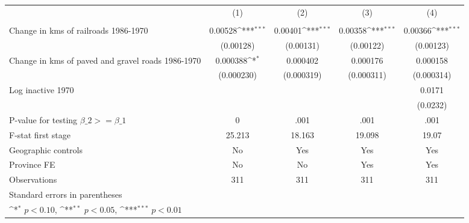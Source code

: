 {
\def\sym#1{\ifmmode^{#1}\else\(^{#1}\)\fi}
\begin{tabular}{l*{4}{c}}
\hline\hline
                &\multicolumn{1}{c}{(1)}&\multicolumn{1}{c}{(2)}&\multicolumn{1}{c}{(3)}&\multicolumn{1}{c}{(4)}\\
                &\multicolumn{1}{c}{}&\multicolumn{1}{c}{}&\multicolumn{1}{c}{}&\multicolumn{1}{c}{}\\
\hline
Change in kms of railroads 1986-1970&  0.00528\sym{***}&  0.00401\sym{***}&  0.00358\sym{***}&  0.00366\sym{***}\\
                &(0.00128)         &(0.00131)         &(0.00122)         &(0.00123)         \\
[1em]
Change in kms of paved and gravel roads 1986-1970& 0.000388\sym{*}  & 0.000402         & 0.000176         & 0.000158         \\
                &(0.000230)         &(0.000319)         &(0.000311)         &(0.000314)         \\
[1em]
Log inactive 1970&                  &                  &                  &   0.0171         \\
                &                  &                  &                  & (0.0232)         \\
\hline
P-value for testing $\beta\_{2} >= \beta\_{1}$&        0         &     .001         &     .001         &     .001         \\
F-stat first stage&   25.213         &   18.163         &   19.098         &    19.07         \\
Geographic controls&       No         &      Yes         &      Yes         &      Yes         \\
Province FE     &       No         &       No         &      Yes         &      Yes         \\
Observations    &      311         &      311         &      311         &      311         \\
\hline\hline
\multicolumn{5}{l}{\footnotesize Standard errors in parentheses}\\
\multicolumn{5}{l}{\footnotesize \sym{*} \(p<0.10\), \sym{**} \(p<0.05\), \sym{***} \(p<0.01\)}\\
\end{tabular}
}
